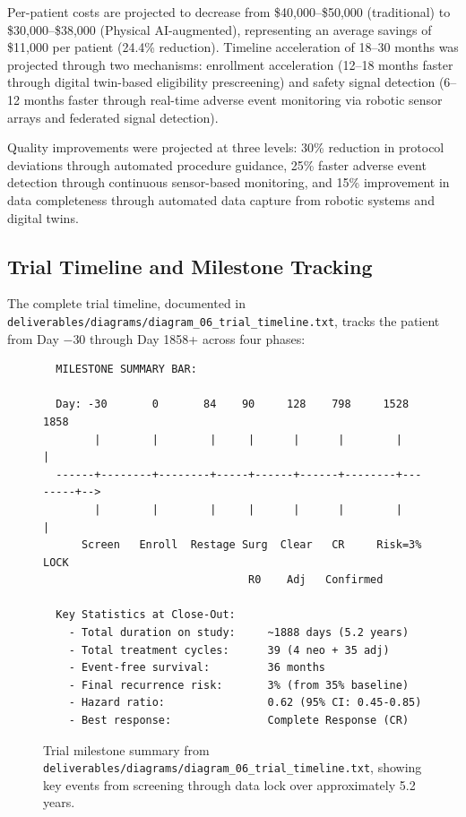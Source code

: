 Per-patient costs are projected to decrease from \$40,000--\$50,000 (traditional) to \$30,000--\$38,000 (Physical AI-augmented), representing an average savings of \$11,000 per patient (24.4\% reduction). Timeline acceleration of 18--30 months was projected through two mechanisms: enrollment acceleration (12--18 months faster through digital twin-based eligibility prescreening) and safety signal detection (6--12 months faster through real-time adverse event monitoring via robotic sensor arrays and federated signal detection).

Quality improvements were projected at three levels: 30\% reduction in protocol deviations through automated procedure guidance, 25\% faster adverse event detection through continuous sensor-based monitoring, and 15\% improvement in data completeness through automated data capture from robotic systems and digital twins.

\subsection{Trial Timeline and Milestone Tracking}

The complete trial timeline, documented in \texttt{deliverables/diagrams/diagram\_06\_trial\_timeline.txt}, tracks the patient from Day $-$30 through Day 1858+ across four phases:

\begin{figure}[H]
\begin{verbatim}
  MILESTONE SUMMARY BAR:

  Day: -30       0       84    90     128    798     1528     1858
        |        |        |     |      |      |        |        |
  ------+--------+--------+-----+------+------+--------+--------+-->
        |        |        |     |      |      |        |        |
      Screen   Enroll  Restage Surg  Clear   CR     Risk=3%   LOCK
                                R0    Adj   Confirmed

  Key Statistics at Close-Out:
    - Total duration on study:     ~1888 days (5.2 years)
    - Total treatment cycles:      39 (4 neo + 35 adj)
    - Event-free survival:         36 months
    - Final recurrence risk:       3% (from 35% baseline)
    - Hazard ratio:                0.62 (95% CI: 0.45-0.85)
    - Best response:               Complete Response (CR)
\end{verbatim}
\caption{Trial milestone summary from \texttt{deliverables/diagrams/diagram\_06\_trial\_timeline.txt}, showing key events from screening through data lock over approximately 5.2 years.}
\label{fig:trial-timeline}
\end{figure}


